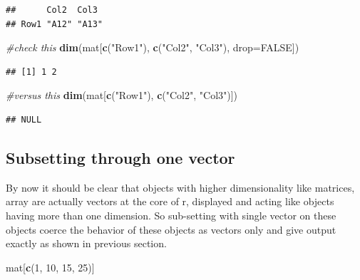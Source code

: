 \documentclass[
]{book}
\newenvironment{Shaded}{\begin{snugshade}}{\end{snugshade}}
\newcommand{\AttributeTok}[1]{\textcolor[rgb]{0.13,0.29,0.53}{#1}}
\newcommand{\CommentTok}[1]{\textcolor[rgb]{0.56,0.35,0.01}{\textit{#1}}}
\newcommand{\ConstantTok}[1]{\textcolor[rgb]{0.56,0.35,0.01}{#1}}
\newcommand{\DecValTok}[1]{\textcolor[rgb]{0.00,0.00,0.81}{#1}}
\newcommand{\FunctionTok}[1]{\textcolor[rgb]{0.13,0.29,0.53}{\textbf{#1}}}
\newcommand{\NormalTok}[1]{#1}
\newcommand{\StringTok}[1]{\textcolor[rgb]{0.31,0.60,0.02}{#1}}
\begin{document}
\begin{verbatim}
##      Col2  Col3 
## Row1 "A12" "A13"
\end{verbatim}

\begin{Shaded}
\begin{Highlighting}[]
\CommentTok{\#check this}
\FunctionTok{dim}\NormalTok{(mat[}\FunctionTok{c}\NormalTok{(}\StringTok{"Row1"}\NormalTok{), }\FunctionTok{c}\NormalTok{(}\StringTok{"Col2"}\NormalTok{, }\StringTok{"Col3"}\NormalTok{), }\AttributeTok{drop=}\ConstantTok{FALSE}\NormalTok{])}
\end{Highlighting}
\end{Shaded}

\begin{verbatim}
## [1] 1 2
\end{verbatim}

\begin{Shaded}
\begin{Highlighting}[]
\CommentTok{\#versus this}
\FunctionTok{dim}\NormalTok{(mat[}\FunctionTok{c}\NormalTok{(}\StringTok{"Row1"}\NormalTok{), }\FunctionTok{c}\NormalTok{(}\StringTok{"Col2"}\NormalTok{, }\StringTok{"Col3"}\NormalTok{)])}
\end{Highlighting}
\end{Shaded}

\begin{verbatim}
## NULL
\end{verbatim}

\hypertarget{subsetting-through-one-vector}{%
\subsection{Subsetting through one vector}\label{subsetting-through-one-vector}}

By now it should be clear that objects with higher dimensionality like matrices, array are actually vectors at the core of r, displayed and acting like objects having more than one dimension. So sub-setting with single vector on these objects coerce the behavior of these objects as vectors only and give output exactly as shown in previous section.

\begin{Shaded}
\begin{Highlighting}[]
\NormalTok{mat[}\FunctionTok{c}\NormalTok{(}\DecValTok{1}\NormalTok{, }\DecValTok{10}\NormalTok{, }\DecValTok{15}\NormalTok{, }\DecValTok{25}\NormalTok{)]}
\end{Highlighting}
\end{Shaded}
\end{document}
